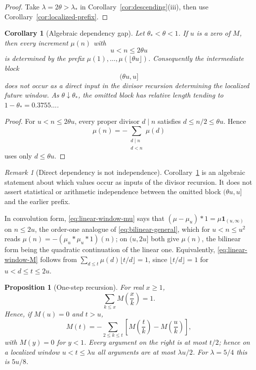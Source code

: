 \documentclass[11pt]{amsart}
\numberwithin{equation}{section}
\theoremstyle{plain}
\newtheorem{proposition}[theorem]{Proposition}
\newtheorem{corollary}[theorem]{Corollary}
\theoremstyle{definition}
\theoremstyle{remark}
\newtheorem{remark}[theorem]{Remark}
\begin{document}
\begin{proof}
Take $\lambda=2\theta>\lambda_*$ in
Corollary~\ref{cor:descending}(iii), then use
Corollary~\ref{cor:localized-prefix}.
\end{proof}


\begin{corollary}[Algebraic dependency gap]
\label{cor:dependency-gap}
Let $\theta_*<\theta<1$.  If $u$ is a zero of $M$, then every increment
$\mu(n)$ with
\[
u<n\le2\theta u
\]
is determined by the prefix
$\mu(1),\ldots,\mu(\lfloor\theta u\rfloor)$.  Consequently the intermediate
block
\[
(\theta u,u]
\]
does not occur as a direct input in the divisor recursion determining the
localized future window.  As $\theta\downarrow\theta_*$, the omitted block
has relative length tending to
$1-\theta_*=0.3755\ldots$.
\end{corollary}

\begin{proof}
For $u<n\le2\theta u$, every proper divisor $d\mid n$ satisfies
$d\le n/2\le\theta u$.  Hence
\[
\mu(n)=-\sum_{\substack{d\mid n\\ d<n}}\mu(d)
\]
uses only $d\le\theta u$.
\end{proof}

\begin{remark}[Direct dependency is not independence]
Corollary~\ref{cor:dependency-gap} is an algebraic statement about which
values occur as inputs of the divisor recursion.  It does not assert
statistical or arithmetic independence between the omitted block
$(\theta u,u]$ and the earlier prefix.
\end{remark}

In convolution form, \eqref{eq:linear-window-mu} says that
$(\mu-\mu_u)*1=\mu\mathbf 1_{(u,\infty)}$ on $n\le2u$, the order-one analogue
of \eqref{eq:bilinear-general}, which for $u<n\le u^2$ reads
$\mu(n)=-(\mu_u*\mu_u*1)(n)$; on $(u,2u]$ both give $\mu(n)$, the
bilinear form being the quadratic continuation of the linear one. Equivalently, \eqref{eq:linear-window-M}
follows from $\sum_{d\le t}\mu(d)\lfloor t/d\rfloor=1$, since
$\lfloor t/d\rfloor=1$ for $u<d\le t\le2u$.

\begin{proposition}[One-step recursion]
\label{prop:one-step}
For real $x\ge1$,
\begin{equation}
\label{eq:hyperbola-M}
\sum_{k\le x}M\!\left(\frac xk\right)=1 .
\end{equation}
Hence, if $M(u)=0$ and $t>u$,
\begin{equation}
\label{eq:descent-identity}
M(t)=-\sum_{2\le k\le t}\left[M\!\left(\frac tk\right)-M\!\left(\frac uk\right)\right],
\end{equation}
with $M(y)=0$ for $y<1$. Every argument on the right is at most $t/2$; hence on a localized
window $u<t\le\lambda u$ all arguments are at most $\lambda u/2$.  For
$\lambda=5/4$ this is $5u/8$.
\end{proposition}
\end{document}
